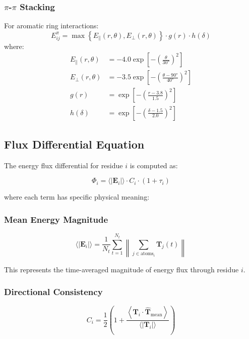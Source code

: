 \documentclass{article}
\begin{document}
\subsubsection{$\pi$-$\pi$ Stacking}
For aromatic ring interactions:
\begin{equation}
E_{ij}^{\pi} = \max\left\{E_{\parallel}(r,\theta), E_{\perp}(r,\theta)\right\} \cdot g(r) \cdot h(\delta)
\end{equation}
where:
\begin{align}
E_{\parallel}(r,\theta) &= -4.0 \exp\left[-\left(\frac{\theta}{30°}\right)^2\right] \\
E_{\perp}(r,\theta) &= -3.5 \exp\left[-\left(\frac{\theta - 90°}{40°}\right)^2\right] \\
g(r) &= \exp\left[-\left(\frac{r - 3.8}{1.5}\right)^2\right] \\
h(\delta) &= \exp\left[-\left(\frac{\delta - 1.5}{2.0}\right)^2\right]
\end{align}

\subsection{Flux Differential Equation}

The energy flux differential for residue $i$ is computed as:

\begin{equation}
\Phi_i = \langle|\mathbf{E}_i|\rangle \cdot C_i \cdot (1 + \tau_i)
\end{equation}

where each term has specific physical meaning:

\subsubsection{Mean Energy Magnitude}
\begin{equation}
\langle|\mathbf{E}_i|\rangle = \frac{1}{N_t} \sum_{t=1}^{N_t} \left\|\sum_{j \in \text{atoms}_i} \mathbf{T}_j(t)\right\|
\end{equation}

This represents the time-averaged magnitude of energy flux through residue $i$.

\subsubsection{Directional Consistency}
\begin{equation}
C_i = \frac{1}{2}\left(1 + \frac{\left\langle\mathbf{T}_i \cdot \hat{\mathbf{T}}_{\text{mean}}\right\rangle}{\langle|\mathbf{T}_i|\rangle}\right)
\end{equation}
\end{document}
